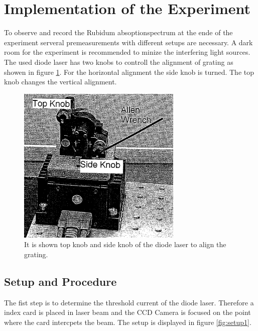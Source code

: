 \section{Implementation of the Experiment}
\label{sec:Durchführung}
To observe and record the Rubidum absoptionspectrum at the ende
of the experiment
serveral premeasurements with different setups are necessary.
A dark room for the experiment is recommended to minize the
interfering light sources.
The used diode laser has two knobs to controll the alignment of grating
as showen in figure \ref{fig:knobs}.
For the horizontal alignment the side knob is turned. The
top knob changes the vertical alignment.
\begin{figure}
  \centering
  \includegraphics[width=0.7\textwidth]{Laserknobs.png}
  \caption{It is shown top knob and side knob of the diode laser to align the grating.\cite{V61}}
  \label{fig:knobs}
\end{figure}


\subsection{Setup and Procedure}
\label{subsec:setup}
The fist step is to determine the threshold current
of the diode laser.
Therefore a index card is placed in laser beam and the CCD Camera
is focused on the point where the card intercpets the beam.
The setup is displayed
in figure \ref{fig:setup1}.

